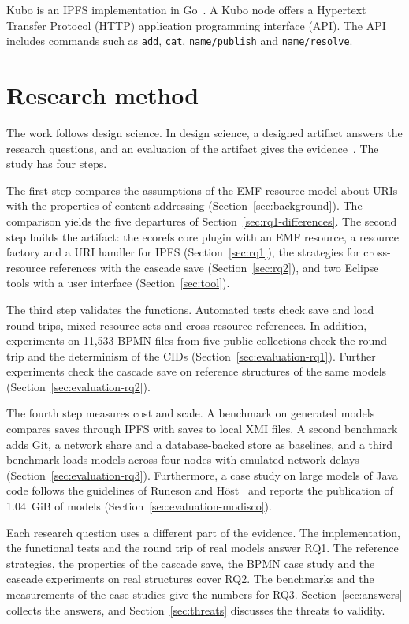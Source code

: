 \documentclass[5p,times,twocolumn]{elsarticle}
\theoremstyle{definition}
\theoremstyle{plain}
\begin{document}
Kubo is an IPFS implementation in Go~\cite{kubo}. A Kubo node offers a Hypertext Transfer Protocol (HTTP) application programming interface (API). The API includes commands such as \texttt{add}, \texttt{cat}, \texttt{name/publish} and \texttt{name/resolve}.

\section{Research method}\label{sec:method}

The work follows design science. In design science, a designed artifact answers the research questions, and an evaluation of the artifact gives the evidence~\cite{hevner2004design}. The study has four steps.

The first step compares the assumptions of the EMF resource model about URIs with the properties of content addressing (Section~\ref{sec:background}). The comparison yields the five departures of Section~\ref{sec:rq1-differences}. The second step builds the artifact: the ecorefs core plugin with an EMF resource, a resource factory and a URI handler for IPFS (Section~\ref{sec:rq1}), the strategies for cross-resource references with the cascade save (Section~\ref{sec:rq2}), and two Eclipse tools with a user interface (Section~\ref{sec:tool}).

The third step validates the functions. Automated tests check save and load round trips, mixed resource sets and cross-resource references. In addition, experiments on 11,533 BPMN files from five public collections check the round trip and the determinism of the CIDs (Section~\ref{sec:evaluation-rq1}). Further experiments check the cascade save on reference structures of the same models (Section~\ref{sec:evaluation-rq2}).

The fourth step measures cost and scale. A benchmark on generated models compares saves through IPFS with saves to local XMI files. A second benchmark adds Git, a network share and a database-backed store as baselines, and a third benchmark loads models across four nodes with emulated network delays (Section~\ref{sec:evaluation-rq3}). Furthermore, a case study on large models of Java code follows the guidelines of Runeson and H\"ost~\cite{runeson2009case} and reports the publication of 1.04~GiB of models (Section~\ref{sec:evaluation-modisco}).

Each research question uses a different part of the evidence. The implementation, the functional tests and the round trip of real models answer RQ1. The reference strategies, the properties of the cascade save, the BPMN case study and the cascade experiments on real structures cover RQ2. The benchmarks and the measurements of the case studies give the numbers for RQ3. Section~\ref{sec:answers} collects the answers, and Section~\ref{sec:threats} discusses the threats to validity.
\end{document}
